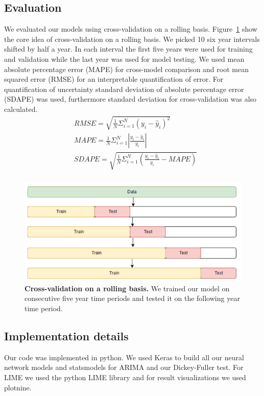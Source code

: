 \documentclass[12pt,journal,compsoc]{IEEEtran}
\begin{document}
\subsection{Evaluation}
\par We evaluated our models using cross-validation on a rolling basis. Figure~\ref{fig:cros-val} show the core idea of cross-validation on a rolling basis. We picked 10 six year intervals shifted by half a year. In each interval the first five years were used for training and validation while the last year was used for model testing.
We used mean absolute percentage error (MAPE) for cross-model comparison and root mean squared error (RMSE) for an interpretable quantification of error.
For quantification of uncertainty standard deviation of absolute percentage error (SDAPE) was used, furthermore standard deviation for cross-validation was also calculated.
\begin{equation}
    \begin{aligned}
    &RMSE = \sqrt{\frac{1}{N}\Sigma^{N}_{i=1} (y_i - \hat{y}_i)^2}\\
    &MAPE = \frac{1}{N}\Sigma^{N}_{i=1} |{\frac{y_i - \hat{y}_i}{y_i}}|\\
    &SDAPE = \sqrt{\frac{1}{N}\Sigma^{N}_{i=1}(\frac{y_i - \hat{y}_i}{y_i} - MAPE)}\\
    \end{aligned}
\end{equation}

\begin{figure}[!ht]\centering
	\includegraphics[width=\linewidth]{images/cros_validation.png}
	\caption{\textbf{Cross-validation on a rolling basis.} We trained our model on consecutive five year time periods and tested it on the following year time period.
	}
	\label{fig:cros-val}
\end{figure}

\subsection{Implementation details}
\par Our code was implemented in python. 
We used Keras to build all our neural network models and statsmodels for ARIMA and our Dickey-Fuller test.
For LIME we used the python LIME library and for result visualizations we used plotnine.
\end{document}
